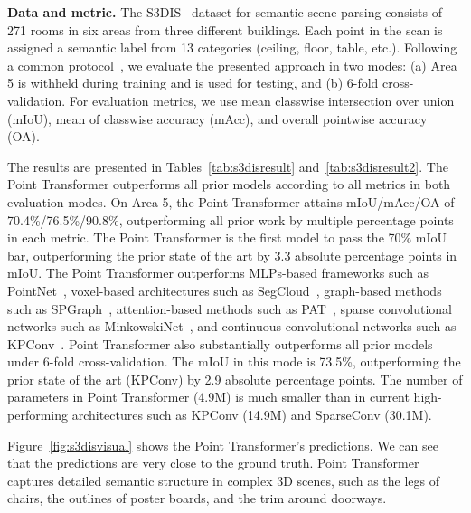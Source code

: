 \noindent\textbf{Data and metric.}
The S3DIS~\cite{armeni2016s3dis} dataset for semantic scene parsing consists of 271 rooms in six areas from three different buildings. Each point in the scan is assigned a semantic label from 13 categories (ceiling, floor, table, etc.). Following a common protocol~\cite{tchapmi2017segcloud,qi2017pointnet2}, we evaluate the presented approach in two modes: (a) Area 5 is withheld during training and is used for testing, and (b) 6-fold cross-validation. For evaluation metrics, we use mean classwise intersection over union (mIoU), mean of classwise accuracy (mAcc), and overall pointwise accuracy (OA).

The results are presented in Tables~\ref{tab:s3disresult} and~\ref{tab:s3disresult2}. The Point Transformer outperforms all prior models according to all metrics in both evaluation modes. On Area 5, the Point Transformer attains mIoU/mAcc/OA of 70.4\%/76.5\%/90.8\%, outperforming all prior work by multiple percentage points in each metric. The Point Transformer is the first model to pass the 70\% mIoU bar, outperforming the prior state of the art by 3.3 absolute percentage points in mIoU. The Point Transformer outperforms MLPs-based frameworks such as PointNet~\cite{qi2017pointnet}, voxel-based architectures such as SegCloud~\cite{tchapmi2017segcloud}, graph-based methods such as SPGraph~\cite{landrieu2018spg}, attention-based methods such as PAT~\cite{yang2019modeling}, sparse convolutional networks such as MinkowskiNet~\cite{choy20194d}, and continuous convolutional networks such as KPConv~\cite{thomas2019kpconv}.
Point Transformer also substantially outperforms all prior models under 6-fold cross-validation. The mIoU in this mode is 73.5\%, outperforming the prior state of the art (KPConv) by 2.9 absolute percentage points. The number of parameters in Point Transformer (4.9M) is much smaller than in current high-performing architectures such as KPConv (14.9M) and SparseConv (30.1M).

Figure~\ref{fig:s3disvisual} shows the Point Transformer's predictions.
We can see that the predictions are very close to the ground truth. Point Transformer captures detailed semantic structure in complex 3D scenes, such as the legs of chairs, the outlines of poster boards, and the trim around doorways.

